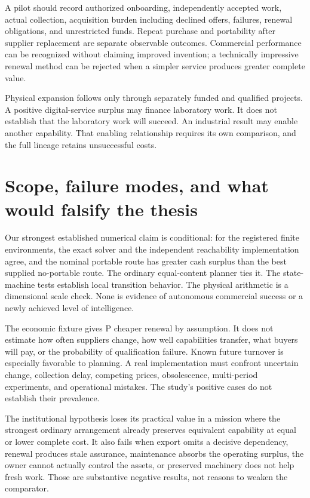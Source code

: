A pilot should record authorized onboarding, independently accepted work, actual collection, acquisition burden including declined offers, failures, renewal obligations, and unrestricted funds. Repeat purchase and portability after supplier replacement are separate observable outcomes. Commercial performance can be recognized without claiming improved invention; a technically impressive renewal method can be rejected when a simpler service produces greater complete value.

Physical expansion follows only through separately funded and qualified projects. A positive digital-service surplus may finance laboratory work. It does not establish that the laboratory work will succeed. An industrial result may enable another capability. That enabling relationship requires its own comparison, and the full lineage retains unsuccessful costs.

\section{Scope, failure modes, and what would falsify the thesis}
\label{sec:limits}
Our strongest established numerical claim is conditional: for the registered finite environments, the exact solver and the independent reachability implementation agree, and the nominal portable route has greater cash surplus than the best supplied no-portable route. The ordinary equal-content planner ties it. The state-machine tests establish local transition behavior. The physical arithmetic is a dimensional scale check. None is evidence of autonomous commercial success or a newly achieved level of intelligence.

The economic fixture gives P cheaper renewal by assumption. It does not estimate how often suppliers change, how well capabilities transfer, what buyers will pay, or the probability of qualification failure. Known future turnover is especially favorable to planning. A real implementation must confront uncertain change, collection delay, competing prices, obsolescence, multi-period experiments, and operational mistakes. The study's positive cases do not establish their prevalence.

The institutional hypothesis loses its practical value in a mission where the strongest ordinary arrangement already preserves equivalent capability at equal or lower complete cost. It also fails when export omits a decisive dependency, renewal produces stale assurance, maintenance absorbs the operating surplus, the owner cannot actually control the assets, or preserved machinery does not help fresh work. Those are substantive negative results, not reasons to weaken the comparator.


